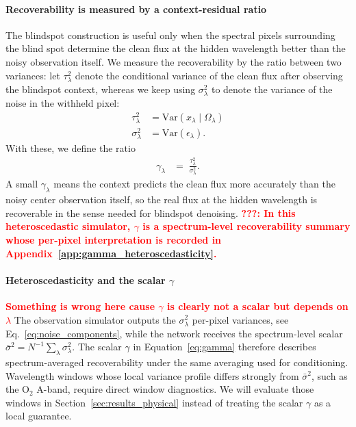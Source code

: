 \documentclass[twocolumn]{aastex7}
\newcommand{\ld}[1]{\textcolor{red}{\textbf{#1}}}
\begin{document}
\paragraph{Recoverability is measured by a context-residual ratio}
The blindspot construction is useful only when the spectral pixels surrounding the blind spot determine the clean flux at the hidden wavelength better than the noisy observation itself. We measure the recoverability by the ratio between two variances: let $\tau_\lambda^{2}$ denote the conditional variance of the clean flux after observing the blindspot context, whereas we keep using $\sigma_\lambda^{2}$ to denote the variance of the noise in the withheld pixel:
\begin{align}
    \tau_\lambda^{2} &= \mathrm{Var}(x_{\lambda}\mid\Omega_{\lambda}) \\[1em]
    \sigma_\lambda^{2} &= \mathrm{Var}(\epsilon_{\lambda}).
\end{align}
With these, we define the ratio
\begin{align}
    \gamma_\lambda &=\; \frac{\tau_\lambda^{2}}{\sigma_\lambda^{2}}.
    \label{eq:gamma}
\end{align}
A small $\gamma_\lambda$ means the context predicts the clean flux more accurately than the noisy center observation itself, so the real flux at the hidden wavelength is recoverable in the sense needed for blindspot denoising. \ld{???: In this heteroscedastic simulator, $\gamma$ is a spectrum-level recoverability summary whose per-pixel interpretation is recorded in Appendix~\ref{app:gamma_heteroscedasticity}.}

\paragraph{Heteroscedasticity and the scalar $\gamma$} \ld{Something is wrong here cause $\gamma$ is clearly not a scalar but depends on $\lambda$}
The observation simulator outputs the $\sigma_{\lambda}^{2}$ per-pixel variances, see Eq.~\ref{eq:noise_components}, while the network receives the spectrum-level scalar $\bar{\sigma}^{2}=N^{-1}\sum_{\lambda}\sigma_{\lambda}^{2}$. The scalar $\gamma$ in Equation~\ref{eq:gamma} therefore describes spectrum-averaged recoverability under the same averaging used for conditioning. Wavelength windows whose local variance profile differs strongly from $\bar{\sigma}^{2}$, such as the \mbox{O$_2$} A-band, require direct window diagnostics. We will evaluate those windows in Section~\ref{sec:results_physical} instead of treating the scalar $\gamma$ as a local guarantee.
\end{document}
